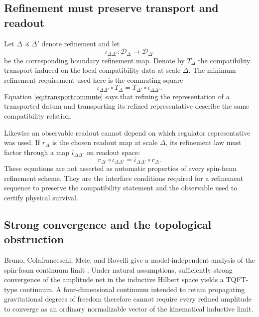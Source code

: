 \documentclass[aps,prd,reprint,nofootinbib,superscriptaddress]{revtex4-2}
\begin{document}
\subsection{Refinement must preserve transport and readout}

Let $\Delta\preceq\Delta'$ denote refinement and let
\begin{equation}
\iota_{\Delta\Delta'}:
\mathcal D_\Delta\longrightarrow\mathcal D_{\Delta'}
\label{eq:refmap}
\end{equation}
be the corresponding boundary refinement map. Denote by $T_\Delta$ the compatibility transport induced on the local compatibility data at scale $\Delta$. The minimum refinement requirement used here is the commuting square
\begin{equation}
\boxed{
\iota_{\Delta\Delta'}\circ T_\Delta
=
T_{\Delta'}\circ\iota_{\Delta\Delta'}.
}
\label{eq:transportcommute}
\end{equation}
Equation \eqref{eq:transportcommute} says that refining the representation of a transported datum and transporting its refined representative describe the same compatibility relation.

Likewise an observable readout cannot depend on which regulator representative was used. If $r_\Delta$ is the chosen readout map at scale $\Delta$, its refinement law must factor through a map $\bar\iota_{\Delta\Delta'}$ on readout space:
\begin{equation}
\boxed{
r_{\Delta'}\circ\iota_{\Delta\Delta'}
=
\bar\iota_{\Delta\Delta'}\circ r_\Delta.
}
\label{eq:readoutcommute}
\end{equation}
These equations are not asserted as automatic properties of every spin-foam refinement scheme. They are the interface conditions required for a refinement sequence to preserve the compatibility statement and the observable used to certify physical survival.

\subsection{Strong convergence and the topological obstruction}

Bruno, Colafranceschi, Mele, and Rovelli give a model-independent analysis of the spin-foam continuum limit \cite{BrunoEtAl2026}. Under natural assumptions, sufficiently strong convergence of the amplitude net in the inductive Hilbert space yields a TQFT-type continuum. A four-dimensional continuum intended to retain propagating gravitational degrees of freedom therefore cannot require every refined amplitude to converge as an ordinary normalizable vector of the kinematical inductive limit.
\end{document}
